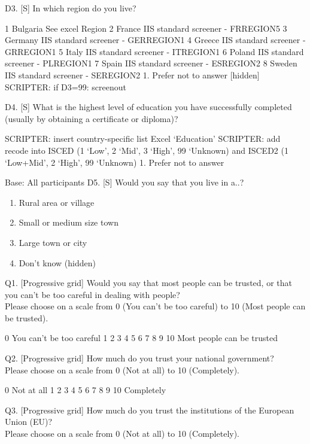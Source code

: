 \documentclass[
  12pt,
  a4paper,
]{article}
\providecommand{\tightlist}{%
  \setlength{\itemsep}{0pt}\setlength{\parskip}{0pt}}
\begin{document}
D3. {[}S{]} In which region do you live?

1 Bulgaria See excel Region
2 France IIS standard screener - FRREGION5
3 Germany IIS standard screener - GERREGION1
4 Greece IIS standard screener - GRREGION1
5 Italy IIS standard screener - ITREGION1
6 Poland IIS standard screener - PLREGION1
7 Spain IIS standard screener - ESREGION2
8 Sweden IIS standard screener - SEREGION2
1. Prefer not to answer {[}hidden{]}\\
SCRIPTER: if D3=99: screenout

D4. {[}S{]} What is the highest level of education you have successfully completed (usually by obtaining a certificate or diploma)?

SCRIPTER: insert country-specific list Excel `Education'
SCRIPTER: add recode into ISCED (1 `Low', 2 `Mid', 3 `High', 99 `Unknown) and ISCED2 (1 `Low+Mid', 2 `High', 99 `Unknown)
1. Prefer not to answer

Base: All participants
D5. {[}S{]} Would you say that you live in a..?

\begin{enumerate}
\def\labelenumi{\arabic{enumi}.}
\tightlist
\item
  Rural area or village\\
\item
  Small or medium size town\\
\item
  Large town or city\\
\item
  Don't know (hidden)
\end{enumerate}

Q1. {[}Progressive grid{]} Would you say that most people can be trusted, or that you can't be too careful in dealing with people?\\
Please choose on a scale from 0 (You can't be too careful) to 10 (Most people can be trusted).

0
You can't be too careful 1 2 3 4 5 6 7 8 9 10
Most people can be trusted

Q2. {[}Progressive grid{]} How much do you trust your national government?\\
Please choose on a scale from 0 (Not at all) to 10 (Completely).

0
Not at all 1 2 3 4 5 6 7 8 9 10
Completely

Q3. {[}Progressive grid{]} How much do you trust the institutions of the European Union (EU)?\\
Please choose on a scale from 0 (Not at all) to 10 (Completely).
\end{document}
